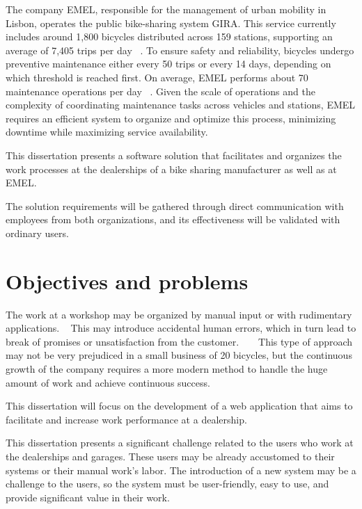 The company \ac{EMEL}, responsible for the management of urban mobility in Lisbon, operates the public bike-sharing system GIRA. This service currently includes around 1,800 bicycles distributed across 159 stations, supporting an average of 7,405 trips per day ~\cite{Gira_Trips}. To ensure safety and reliability, bicycles undergo preventive maintenance either every 50 trips or every 14 days, depending on which threshold is reached first. On average, \ac{EMEL} performs about 70 maintenance operations per day ~\cite{Gira_Maintenance}. Given the scale of operations and the complexity of coordinating maintenance tasks across vehicles and stations, \ac{EMEL} requires an efficient system to organize and optimize this process, minimizing downtime while maximizing service availability.

This dissertation presents a software solution that facilitates and organizes the work processes at the dealerships of a bike sharing manufacturer as well as at \ac{EMEL}. 

The solution requirements will be gathered through direct communication with employees from both organizations, and its effectiveness will be validated with ordinary users.


\section{Objectives and problems}

The work at a workshop may be organized by manual input or with rudimentary applications. ~\cite{MAS_MOTORS} 
This may introduce accidental human errors, which in turn lead to break of promises or unsatisfaction from the customer. ~\cite{MAS_MOTORS} ~\cite{Setting_the_after_sale_process}
This type of approach may not be very prejudiced in a small business of 20 bicycles, but the continuous growth of the company requires a more modern method to handle the huge amount of work and achieve continuous success. ~\cite{MAS_MOTORS}

This dissertation will focus on the development of a web application that aims to facilitate and increase work performance at a dealership. 

This dissertation presents a significant challenge related to the users who work at the dealerships and garages. 
These users may be already accustomed to their systems or their manual work's labor.  
The introduction of a new system may be a challenge to the users, so the system must be user-friendly, easy to use, and provide significant value in their work.

